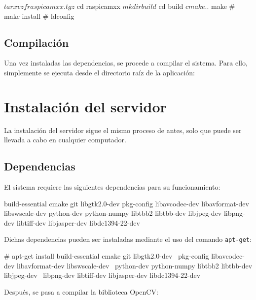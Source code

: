 \vspace{-0.1cm}

\begin{listing}[%
  style    = consola]
$ tar xvzf raspicamxx.tgz
$ cd raspicamxx
$ mkdir build
$ cd build
$ cmake ..
$ make
# make install
# ldconfig
\end{listing}

\subsection{Compilación}

Una vez instaladas las dependencias, se procede a compilar el sistema. Para ello, simplemente se
ejecuta desde el directorio raíz de la aplicación:


\section{Instalación del servidor}

La instalación del servidor sigue el mismo proceso de antes, solo que puede ser llevada a cabo en
cualquier computador.

\subsection{Dependencias}

El sistema requiere las siguientes dependencias para su funcionamiento:
\begin{listing}[%
  style=consola]
build-essential
cmake
git
libgtk2.0-dev
pkg-config
libavcodec-dev
libavformat-dev
libswscale-dev
python-dev
python-numpy
libtbb2
libtbb-dev
libjpeg-dev
libpng-dev
libtiff-dev
libjasper-dev
libdc1394-22-dev
\end{listing}

Dichas dependencias pueden ser instaladas mediante el uso del comando \texttt{apt-get}:

\begin{listing}[%
  style=consola]
# apt-get install build-essential cmake git libgtk2.0-dev \
    pkg-config libavcodec-dev libavformat-dev libswscale-dev \
    python-dev python-numpy libtbb2 libtbb-dev libjpeg-dev \
    libpng-dev libtiff-dev libjasper-dev libdc1394-22-dev
\end{listing}

Después, se pasa a compilar la biblioteca OpenCV:

